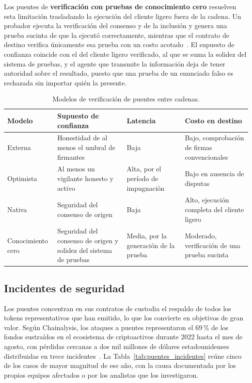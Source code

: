 Los puentes de \textbf{verificación con pruebas de conocimiento cero} resuelven esta limitación
trasladando la ejecución del cliente ligero fuera de la cadena. Un probador ejecuta la
verificación del consenso y de la inclusión y genera una prueba sucinta de que la ejecutó
correctamente, mientras que el contrato de destino verifica únicamente esa prueba con un costo
acotado~\cite{xie2022zkbridge}. El supuesto de confianza coincide con el del cliente ligero
verificado, al que se suma la solidez del sistema de pruebas, y el agente que transmite la
información deja de tener autoridad sobre el resultado, puesto que una prueba de un enunciado
falso es rechazada sin importar quién la presente.

\begin{table}[htbp]
	\centering
	\caption{Modelos de verificación de puentes entre cadenas.}
	\label{tab:puentes_verificacion}
	\small
	\begin{tabular}{>{\raggedright\arraybackslash}p{2.6cm} >{\raggedright\arraybackslash}p{4.4cm} >{\raggedright\arraybackslash}p{2.6cm} >{\raggedright\arraybackslash}p{4.2cm}}
		\toprule
		\textbf{Modelo} & \textbf{Supuesto de confianza} & \textbf{Latencia} &
		\textbf{Costo en destino} \\
		\midrule
		Externa & Honestidad de al menos el umbral de firmantes & Baja & Bajo, comprobación de firmas
		convencionales \\
		\addlinespace
		Optimista & Al menos un vigilante honesto y activo & Alta, por el período de impugnación &
		Bajo en ausencia de disputas \\
		\addlinespace
		Nativa & Seguridad del consenso de origen & Baja & Alto, ejecución completa del cliente
		ligero \\
		\addlinespace
		Conocimiento cero & Seguridad del consenso de origen y solidez del sistema de pruebas &
		Media, por la generación de la prueba & Moderado, verificación de una prueba sucinta \\
		\bottomrule
	\end{tabular}
\end{table}

\subsection{Incidentes de seguridad}
\label{sec:puentes_incidentes}

Los puentes concentran en sus contratos de custodia el respaldo de todos los tokens
representativos que han emitido, lo que los convierte en objetivos de gran valor. Según
Chainalysis, los ataques a puentes representaron el 69\,\% de los fondos sustraídos en el
ecosistema de criptoactivos durante 2022 hasta el mes de agosto, con pérdidas cercanas a dos mil
millones de dólares estadounidenses distribuidas en trece incidentes~\cite{chainalysis2022bridges}.
La Tabla~\ref{tab:puentes_incidentes} reúne cinco de los casos de mayor magnitud de ese año, con
la causa documentada por los propios equipos afectados o por los analistas que los investigaron.

